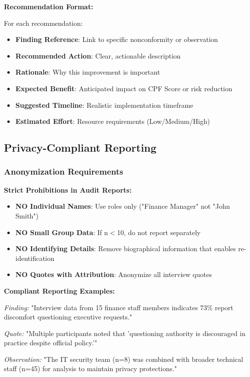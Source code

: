 \documentclass[11pt,a4paper]{article}
\begin{document}
\textbf{Recommendation Format:}

For each recommendation:
\begin{itemize}
\item \textbf{Finding Reference}: Link to specific nonconformity or observation
\item \textbf{Recommended Action}: Clear, actionable description
\item \textbf{Rationale}: Why this improvement is important
\item \textbf{Expected Benefit}: Anticipated impact on CPF Score or risk reduction
\item \textbf{Suggested Timeline}: Realistic implementation timeframe
\item \textbf{Estimated Effort}: Resource requirements (Low/Medium/High)
\end{itemize}

\subsection{Privacy-Compliant Reporting}

\subsubsection{Anonymization Requirements}

\textbf{Strict Prohibitions in Audit Reports:}

\begin{itemize}
\item \textbf{NO Individual Names}: Use roles only ("Finance Manager" not "John Smith")
\item \textbf{NO Small Group Data}: If n$<$10, do not report separately
\item \textbf{NO Identifying Details}: Remove biographical information that enables re-identification
\item \textbf{NO Quotes with Attribution}: Anonymize all interview quotes
\end{itemize}

\textbf{Compliant Reporting Examples:}

\textit{Finding:} "Interview data from 15 finance staff members indicates 73\% report discomfort questioning executive requests."

\textit{Quote:} "Multiple participants noted that 'questioning authority is discouraged in practice despite official policy.'"

\textit{Observation:} "The IT security team (n=8) was combined with broader technical staff (n=45) for analysis to maintain privacy protections."
\end{document}
